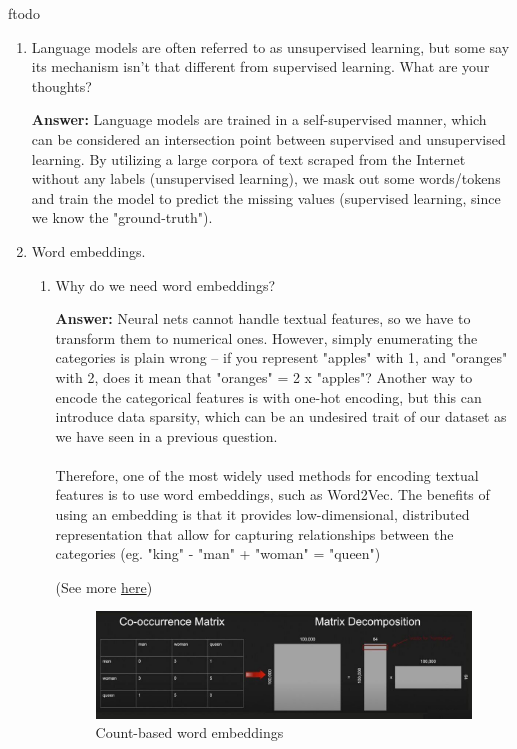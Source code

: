 ƒtodo\documentclass{article}
\newenvironment{QandA}{\begin{enumerate}[label=\arabic*.]}{\end{enumerate}}
\newenvironment{InnerQandA}{\begin{enumerate}[label=\roman*.]}{\end{enumerate}}
\newenvironment{answer}{\par\normalfont \textbf{Answer:}}{}
\begin{document}
\begin{QandA}
\begin{answer}
            (Source: \href{https://en.wikipedia.org/wiki/Density_estimation}{Wikipedia} \href{https://en.wikipedia.org/wiki/Language_model}{Wikipedia})
        \end{answer}
    

    \item Language models are often referred to as unsupervised learning, but some say its mechanism isn’t that different from supervised learning. What are your thoughts?
    \begin{answer}
        Language models are trained in a self-supervised manner, which can be considered an intersection point between supervised and unsupervised learning. By utilizing a large corpora of text scraped from the Internet without any labels (unsupervised learning), we mask out some words/tokens and train the model to predict the missing values (supervised learning, since we know the "ground-truth"). 
    \end{answer}

    \item Word embeddings.
    \begin{InnerQandA}
        \item Why do we need word embeddings?
        \begin{answer}
            Neural nets cannot handle textual features, so we have to transform them to numerical ones. However, simply enumerating the categories is plain wrong -- if you represent "apples" with 1, and "oranges" with 2, does it mean that "oranges" = 2 x "apples"? Another way to encode the categorical features is with one-hot encoding, but this can introduce data sparsity, which can be an undesired trait of our dataset as we have seen in a previous question. \\\\
            Therefore, one of the most widely used methods for encoding textual features is to use word embeddings, such as Word2Vec. The benefits of using an embedding is that it provides low-dimensional, distributed representation that allow for capturing relationships between the categories (eg. "king" - "man" + "woman" = "queen")
    
            (See more \href{https://www.fast.ai/2018/04/29/categorical-embeddings/}{here})
        \end{answer}

        \begin{figure}[ht!]
            \centering
            \includegraphics[width=0.8\columnwidth]{img/cooccurance.jpg}
            \caption{Count-based word embeddings}
            \label{fig:count-based-word-embeddings}
        \end{figure}


\end{InnerQandA}
\end{QandA}
\end{document}
